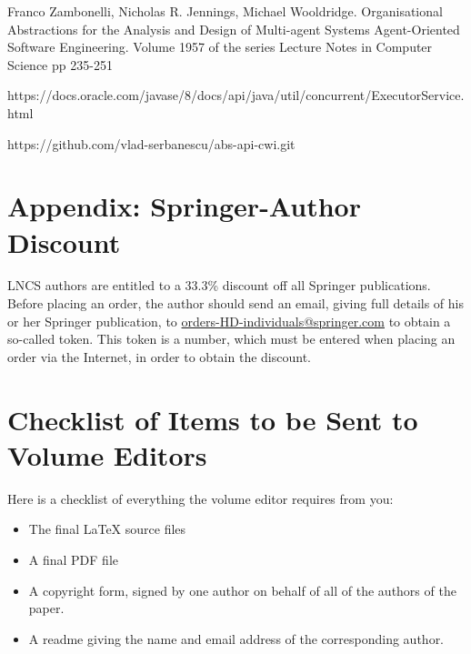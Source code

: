\documentclass[runningheads,a4paper]{llncs}
\begin{document}
\begin{thebibliography}{4}
Franco Zambonelli, Nicholas R. Jennings, Michael Wooldridge. 
Organisational Abstractions for the Analysis and Design of Multi-agent Systems
Agent-Oriented Software Engineering. Volume 1957 of the series Lecture Notes in Computer Science pp 235-251

 https://docs.oracle.com/javase/8/docs/api/java/util/concurrent/ExecutorService.html

https://github.com/vlad-serbanescu/abs-api-cwi.git
\end{thebibliography}


\section*{Appendix: Springer-Author Discount}

LNCS authors are entitled to a 33.3\% discount off all Springer
publications. Before placing an order, the author should send an email, 
giving full details of his or her Springer publication,
to \url{orders-HD-individuals@springer.com} to obtain a so-called token. This token is a
number, which must be entered when placing an order via the Internet, in
order to obtain the discount.

\section{Checklist of Items to be Sent to Volume Editors}
Here is a checklist of everything the volume editor requires from you:


\begin{itemize}
\settowidth{\leftmargin}{{\Large$\square$}}\advance\leftmargin{}
\itemsep8pt\relax
\renewcommand\labelitemi{{\lower1.5pt\hbox{\Large$\square$}}}

\item The final \LaTeX{} source files
\item A final PDF file
\item A copyright form, signed by one author on behalf of all of the
authors of the paper.
\item A readme giving the name and email address of the
corresponding author.
\end{itemize}
\end{document}
